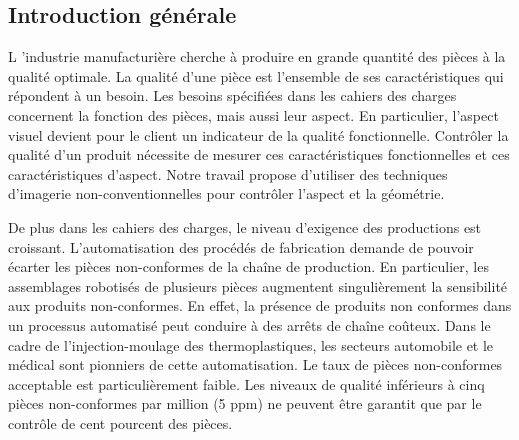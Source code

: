 {}

\vspace*{-1cm}
\begin{flushright}
\section*{\fontsize{20pt}{20pt}\selectfont\textnormal{Introduction générale}}
\end{flushright}
\vspace{2cm}

\chead[\fancyplain{}{}]
      {\fancyplain{}{}}
\lfoot[\fancyplain{}{}]%
      {\fancyplain{}{}}
\cfoot[\fancyplain{}{\thepage}]
      {\fancyplain{}{\thepage}}
\rfoot[\fancyplain{}{}]%
     {\fancyplain{}{\scriptsize}}
     

\lettrine[lines=1]{L}{ }'industrie manufacturière cherche à produire en grande quantité des pièces à la qualité optimale.
La qualité d'une pièce est l'ensemble de ses caractéristiques qui répondent à un besoin.
Les besoins spécifiées dans les cahiers des charges concernent la fonction des pièces, mais aussi leur aspect.
En particulier, l'aspect visuel devient pour le client un indicateur de la qualité fonctionnelle.
Contrôler la qualité d'un produit nécessite de mesurer ces caractéristiques fonctionnelles et ces caractéristiques d'aspect.
Notre travail propose d'utiliser des techniques d'imagerie non-conventionnelles pour contrôler l'aspect et la géométrie.

De plus dans les cahiers des charges, le niveau d'exigence des productions est croissant.
L'automatisation des procédés de fabrication demande de pouvoir écarter les pièces non-conformes de la chaîne de production.
En particulier, les assemblages robotisés de plusieurs pièces augmentent singulièrement la sensibilité aux produits non-conformes.
En effet, la présence de produits non conformes dans un processus automatisé peut conduire à des arrêts de chaîne coûteux.
Dans le cadre de l'injection-moulage des thermoplastiques, les secteurs automobile et le médical sont pionniers de cette automatisation. 
Le taux de pièces non-conformes acceptable est particulièrement faible.
Les niveaux de qualité inférieurs à cinq pièces non-conformes par million (5 ppm) ne peuvent être garantit que par le contrôle de cent pourcent des pièces.

